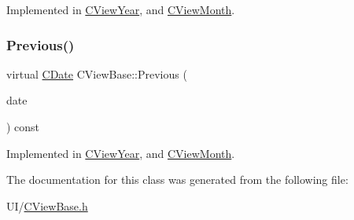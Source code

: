 Implemented in \mbox{\hyperlink{class_c_view_year_a93c8851786eac9fffe55cf006965a505}{C\+View\+Year}}, and \mbox{\hyperlink{class_c_view_month_a61677174b4ffadff768792deeef52b5e}{C\+View\+Month}}.

\mbox{\label{class_c_view_base_a9f5365e3225fb1b96058a9f8a599db6b}} 
\subsubsection{\texorpdfstring{Previous()}{Previous()}}
{\footnotesize\ttfamily virtual \mbox{\hyperlink{class_c_date}{C\+Date}} C\+View\+Base\+::\+Previous (\begin{DoxyParamCaption}\item[{const \mbox{\hyperlink{class_c_date}{C\+Date}} \&}]{date }\end{DoxyParamCaption}) const\hspace{0.3cm}{\ttfamily [pure virtual]}}



Implemented in \mbox{\hyperlink{class_c_view_year_a638b9541c8e0396a263bcff37a126f81}{C\+View\+Year}}, and \mbox{\hyperlink{class_c_view_month_ad945457c5bf0dbd491facee6a0852714}{C\+View\+Month}}.



The documentation for this class was generated from the following file\+:\begin{DoxyCompactItemize}
\item 
U\+I/\mbox{\hyperlink{_c_view_base_8h}{C\+View\+Base.\+h}}\end{DoxyCompactItemize}
